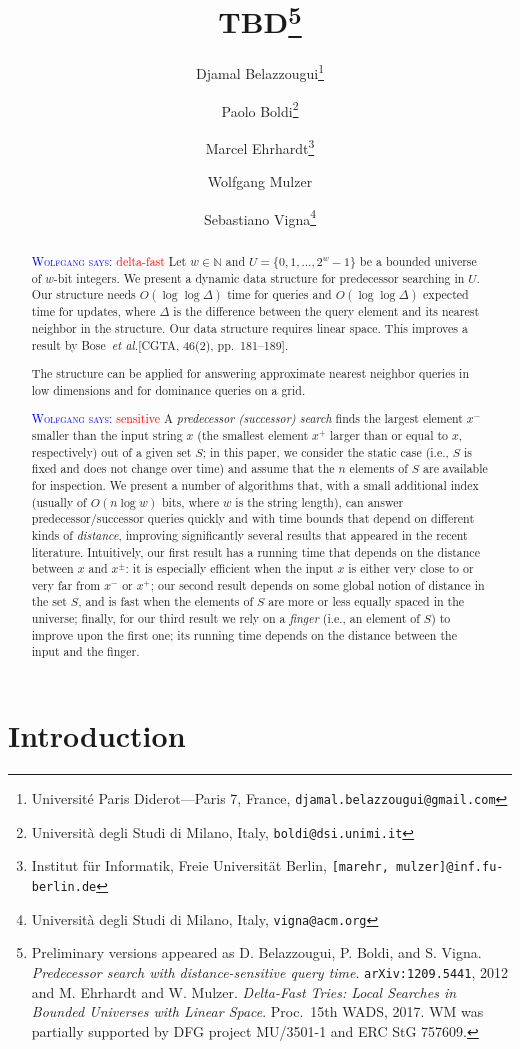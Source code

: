 \documentclass[a4paper,11pt]{article}
\title{TBD\footnote{
Preliminary versions appeared as 
D. Belazzougui, P. Boldi, and S. Vigna. 
\emph{Predecessor search with distance-sensitive query
time}. \texttt{arXiv:1209.5441}, 2012
and 
M. Ehrhardt and W. Mulzer.  \emph{Delta-Fast Tries: Local 
Searches in Bounded Universes with Linear Space}. Proc.~15th WADS,
2017.  WM was partially 
supported by DFG project MU/3501-1 and ERC StG 757609.}}
\author{Djamal Belazzougui\thanks{Universit\'e Paris 
        Diderot---Paris 7, France,
        \texttt{djamal.belazzougui@gmail.com}}
        \and
        Paolo Boldi\thanks{Universit\`a degli Studi di Milano, Italy, 
	\texttt{boldi@dsi.unimi.it}}
        \and
        Marcel Ehrhardt\thanks{Institut f\"ur Informatik, Freie 
	Universit\"at Berlin,
        \texttt{[marehr, mulzer]@inf.fu-berlin.de}}
        \and 
        Wolfgang Mulzer\footnotemark[4]
        \and 
        Sebastiano Vigna\thanks{Universit\`a 
	degli Studi di Milano, Italy, 
	\texttt{vigna@acm.org}}
        }
\date{}
\newcommand{\N}{\mathbb{N}}
\newcommand{\etal}{\emph{et al.}\xspace}
\newcommand{\?}{\mskip1.5mu}
\newcommand{\aremark}[3]{\textcolor{blue}{\textsc{#1 #2:}}
  \textcolor{red}{\textsf{#3}}}
\newcommand{\wolfgang}[2][says]{\aremark{Wolfgang}{#1}{#2}}
\begin{document}
\maketitle

\begin{abstract}
\wolfgang{delta-fast}
Let $w \in \N$ and $U = \{0, 1, \dots, 2^w-1\}$ be a 
bounded universe of $w$-bit integers.  We present a 
dynamic data structure for predecessor searching in 
$U$.  Our structure needs $O(\log \log \Delta)$ time 
for queries and $O(\log \log \Delta)$ expected time 
for updates, where $\Delta$ is the difference between 
the query element and its nearest neighbor in the 
structure. Our data structure requires linear space. 
This improves a result by Bose~\etal [CGTA, 46(2), pp.~181--189].

The structure can be applied for answering approximate nearest
neighbor queries in low dimensions and for dominance queries on
a grid.


\wolfgang{sensitive}
A \emph{predecessor (successor) search} finds the largest 
element $x^-$ smaller than the input string $x$ (the smallest 
element $x^+$ larger than or equal to $x$, respectively) out of 
a given set $S$; in this paper, we consider the static case 
(i.e., $S$ is fixed and does not change over time) and assume 
that the $n$ elements of $S$ are available for inspection. We 
present a number of algorithms that, with a small additional 
index (usually of $O(n\log w)$ bits, where $w$ is the string 
length), can answer predecessor/successor queries quickly and 
with time bounds that depend on different kinds of \emph{distance},
improving significantly several results that appeared in the 
recent literature. Intuitively, our first result has a running 
time that depends on the distance between $x$ and $x^\pm$: 
it is especially efficient when the input $x$ is either very 
close to or very far from $x^-$ or $x^+$; our second result 
depends on some global notion of distance in the set $S$,
and is fast when the elements of $S$ are more or less equally 
spaced in the universe; finally, for our third result we rely 
on a \emph{finger} (i.e., an element of $S$) to improve upon 
the first one; its running time depends on the distance between 
the input and the finger.
\end{abstract}

\section{Introduction}
\end{document}
